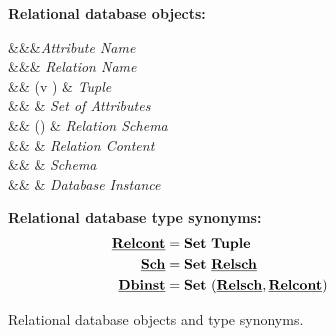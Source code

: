 \begin{figure}

\textbf{Relational database objects:}
\begin{syntax}
\synDef \vAtt \attnametype &&&\textit{Attribute Name}\\
\synDef \vRel \relnametype &&& \textit{Relation Name}\\
\synDef {\underline{\vTuple}} { \tupletype} &\eqq& {(\vi v \numAtts)} & \textit{Tuple}\\
\synDef {\underline{\vAttList}} {\settype \attnametype} &\eqq& 
 & \textit{Set of Attributes}\\
\synDef \pRelSch \pRelSchSet &\eqq& \vRel\left(\underline{\vAttList}\right) & \textit{Relation Schema}\\
\synDef \pRelCont \pRelContSet &\eqq&  & \textit{Relation Content}\\
\synDef \pSch \pSchSet  &\eqq& \vSchDef & \textit{Schema}\\
\synDef \pInst \pInstSet &\eqq&  & \textit{Database Instance}\\
\end{syntax}

\medskip
\textbf{Relational database type synonyms:}
\begin{alignat*}{1}
\pRelContSet &= {\settype \tupletype}\\
\pSchSet &= \settype {\underline \relschtype}\\
{\underline \dbinsttype} &= \settype {(\pRelSchSet, {\underline \relconttype})}
\end{alignat*}
\caption{Relational database objects and type synonyms.}
\label{fig:rdb-def}
\end{figure} 
